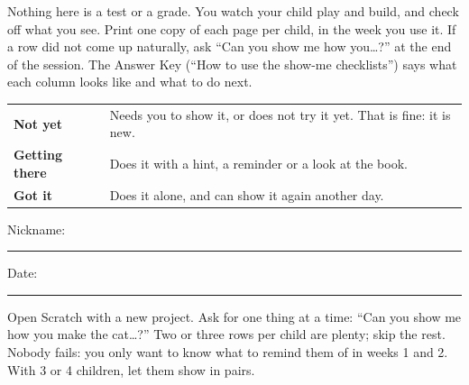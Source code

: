 \documentclass[track=junior,level=3]{kidscode}
\begin{document}

\begin{grownup}
Nothing here is a test or a grade. You watch your child play and build, and check off what you
see. Print one copy of each page per child, in the week you use it. If a row did not come up
naturally, ask \enquote{Can you show me how you\dots?} at the end of the session. The Answer Key
(\enquote{How to use the show-me checklists}) says what each column looks like and what to do next.
\end{grownup}

\begin{center}\renewcommand{\arraystretch}{1.4}
\begin{tabularx}{\linewidth}{@{}>{\bfseries}p{3.4cm}X@{}}
\toprule
Not yet & Needs you to show it, or does not try it yet. That is fine: it is new.\\
Getting there & Does it with a hint, a reminder or a look at the book.\\
Got it & Does it alone, and can show it again another day.\\
\bottomrule
\end{tabularx}
\end{center}


Nickname: \rule{6cm}{0.4pt}\hfill Date: \rule{3.5cm}{0.4pt}

\begin{grownup}
Open Scratch with a new project. Ask for one thing at a time: \enquote{Can you show me how you
make the cat\dots?} Two or three rows per child are plenty; skip the rest. Nobody fails: you only
want to know what to remind them of in weeks 1 and 2. With 3 or 4 children, let them show in pairs.
\end{grownup}

\begin{showme}
\end{showme}
\end{document}
